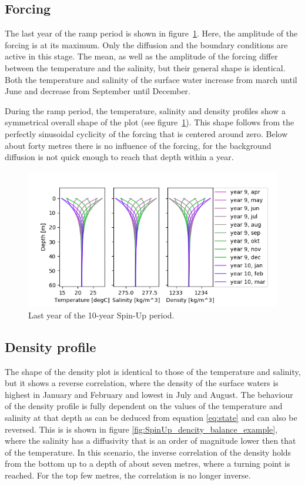 \documentclass[twocolumn]{article}
\begin{document}
\subsection{Forcing}
The last year of the ramp period is shown in figure~\ref{fig:SpinUp}. Here, the amplitude of the forcing is at its maximum. Only the diffusion and the boundary conditions are active in this stage. 
The mean, as well as the amplitude of the forcing differ between the temperature and the salinity, but their general shape is identical. Both the temperature and salinity of the surface water increase from march until June and decrease from September until December. 

During the ramp period, the temperature, salinity and density profiles show a symmetrical overall shape of the plot (see figure~\ref{fig:SpinUp}). This shape follows from the perfectly sinusoidal cyclicity of the forcing that is centered around zero. Below about forty metres there is no influence of the forcing, for the background diffusion is not quick enough to reach that depth within a year. 

\begin{figure}
\centering
\hspace*{-1.2cm}
\includegraphics[width=1.05\textwidth,keepaspectratio]{SpinUp_year_9.png}
\caption{Last year of the 10-year Spin-Up period.}
\label{fig:SpinUp}
\end{figure}
\subsection{Density profile}
The shape of the density plot is identical to those of the temperature and salinity, but it shows a reverse correlation, where the density of the surface waters is highest in January and February and lowest in July and August. 
The behaviour of the density profile is fully dependent on the values of the temperature and salinity at that depth as can be deduced from equation \ref{eq:state} and can also be reversed. This is is shown in figure \ref{fig:SpinUp_dencity_balance_example}, where the salinity has a diffusivity that is an order of magnitude lower then that of the temperature. In this scenario, the inverse correlation of the density holds from the bottom up to a depth of about seven metres, where a turning point is reached. For the top few metres, the correlation is no longer inverse. %
\end{document}
